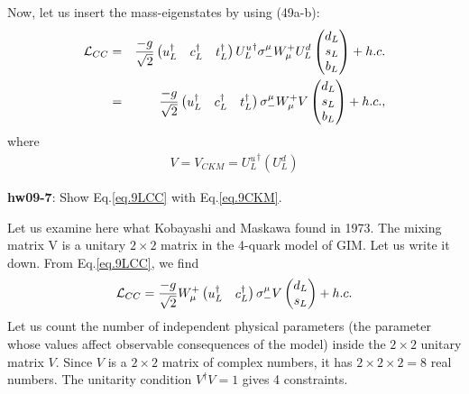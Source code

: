 \documentclass[12pt]{article}
\begin{document}
Now, let us insert the mass-eigenstates by using (49a-b):
\begin{eqnarray}
  {\cal L} _{CC} &=& \frac{-g}{\sqrt2}
  \begin{pmatrix}
    u_L^\dagger & c_L^\dagger & t_L^\dagger
  \end{pmatrix}
  {U^u_L}^\dagger \sigma_-^\mu W^+_\mu U^d_L 
  \begin{pmatrix}
    d_L \\ s_L \\ b_L 
  \end{pmatrix}
  + h.c. \\
  &=& \frac{-g}{\sqrt2} 
  \begin{pmatrix}
    u_L^\dagger & c_L^\dagger & t_L^\dagger
  \end{pmatrix}
\sigma_-^\mu W^+_\mu V 
\begin{pmatrix}
  d_L \\ s_L \\ b_L 
\end{pmatrix}
  + h.c., \label{eq.9LCC}
\end{eqnarray}
where
\begin{eqnarray}
  V = V_{CKM} = {U^u_L}^\dagger (U^d_L) \label{eq.9CKM}
\end{eqnarray}


{\bf hw09-7}: Show Eq.\ref{eq.9LCC} with Eq.\ref{eq.9CKM}.

  Let us examine here what Kobayashi and Maskawa found in 1973.
  The mixing matrix V is a unitary $2 \times 2$ matrix in the 4-quark model of
  GIM.  Let us write it down.  From Eq.\ref{eq.9LCC}, we find
\begin{eqnarray}
  {\cal L}_{CC}
  =
  \frac{-g}{\sqrt2}  W^+_\mu 
  \begin{pmatrix}
    u_L^\dagger & c_L^\dagger
  \end{pmatrix}
  \sigma_-^\mu V 
  \begin{pmatrix}
    d_L \\s_L
  \end{pmatrix}+ h.c.
\end{eqnarray}
  Let us count the number of independent physical parameters (the
  parameter whose values affect observable consequences of the model)
  inside the $2 \times 2$ unitary matrix $V$.
  Since $V$ is a $2 \times 2$ matrix of complex numbers, it has $2\times 2\times 2=8$ real numbers.
  The unitarity condition $V^\dagger V=1$ gives 4 constraints.
\end{document}
